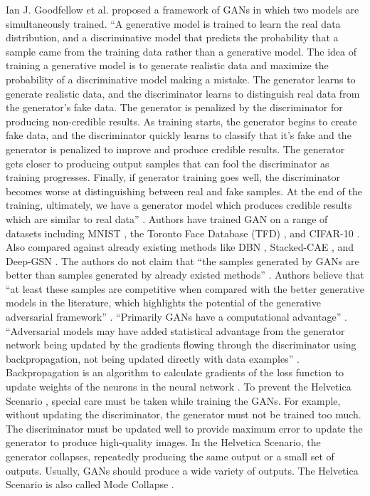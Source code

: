 Ian J. Goodfellow et al.\cite{goodfellow2014generative} proposed a framework of \acp{GAN} in which two models are simultaneously trained. ``A generative model is trained to learn the real data distribution, and a discriminative model that predicts the probability that a sample came from the training data rather than a generative model. The idea of training a generative model is to generate realistic data and maximize the probability of a discriminative model making a mistake. The generator learns to generate realistic data, and the discriminator learns to distinguish real data from the generator's fake data. The generator is penalized by the discriminator for producing non-credible results. As training starts, the generator begins to create fake data, and the discriminator quickly learns to classify that it's fake and the generator is penalized to improve and produce credible results. The generator gets closer to producing output samples that can fool the discriminator as training progresses. Finally, if generator training goes well, the discriminator becomes worse at distinguishing between real and fake samples.  At the end of the training, ultimately, we have a generator model which produces credible results which are similar to real data'' \cite{goodfellow2014generative}. Authors have trained \ac{GAN} on a range of datasets including MNIST \cite{726791}, the Toronto Face Database (TFD) \cite{susskind2010toronto}, and CIFAR-10 \cite{krizhevsky2009learning}. Also compared against already existing methods like \ac{DBN} \cite{bengio2012better}, \ac{Stacked-CAE} \cite{bengio2012better}, and \ac{Deep-GSN} \cite{bengio2014deep}. The authors do not claim that ``the samples generated by \acp{GAN} are better than samples generated by already existed methods'' \cite{goodfellow2014generative}. Authors believe that ``at least these samples are competitive when compared with the better generative models in the literature, which highlights the potential of the generative adversarial framework'' \cite{goodfellow2014generative}. ``Primarily \acp{GAN} have a computational advantage'' \cite{goodfellow2014generative}. ``Adversarial models may have added statistical advantage from the generator network being updated by the gradients flowing through the discriminator using backpropagation, not being updated directly with data examples'' \cite{goodfellow2014generative}. Backpropagation is an algorithm to calculate gradients of the loss function to update weights of the neurons in the neural network \cite{goodfellow2017deep}. To prevent the Helvetica Scenario \cite{manisha2019generative}, special care must be taken while training the \acp{GAN}. For example, without updating the discriminator, the generator must not be trained too much. The discriminator must be updated well to provide maximum error to update the generator to produce high-quality images. In the Helvetica Scenario, the generator collapses, repeatedly producing the same output or a small set of outputs. Usually, \acp{GAN} should produce a wide variety of outputs. The Helvetica Scenario is also called Mode Collapse \cite{thanhtung2020catastrophic}.





